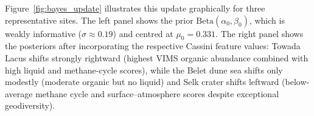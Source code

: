 Figure~\ref{fig:bayes_update} illustrates this update graphically for three
representative sites.  The left panel shows the prior
$\mathrm{Beta}(\alpha_0, \beta_0)$, which is weakly informative
($\sigma \approx 0.19$) and centred at $\mu_0 = 0.331$.  The right panel
shows the posteriors after incorporating the respective Cassini feature
values: Towada Lacus shifts strongly rightward
(highest VIMS organic abundance combined with high liquid and methane-cycle scores), while the Belet dune
sea shifts only modestly (moderate organic but no liquid) and Selk crater shifts
leftward (below-average methane cycle and surface--atmosphere scores despite
exceptional geodiversity).